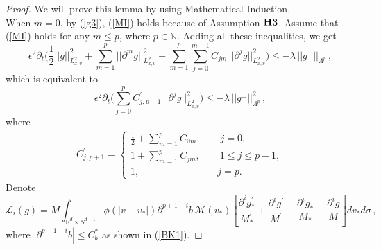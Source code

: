 \documentclass[final,onefignum,onetabnum]{siamart171218}
\begin{document}
 \begin{proof}
We will prove this lemma by using Mathematical Induction. \\
When $m=0$, by (\ref{g3}), (\ref{MI}) holds because of Assumption ${\bf H3}$. 
Assume that (\ref{MI}) holds for any $m\leq p$, where $p\in \mathbb N$. Adding all these inequalities, we get
$$ \epsilon^2 \partial_t \bigg(\frac{1}{2}||g||_{L^2_{x,v}}^2 + \sum_{m=1}^{p} ||\partial^m g||_{L^2_{x,v}}^2 + 
\sum_{m=1}^{p} \sum_{j=0}^{m-1} C_{jm}\, ||\partial^j g||_{L^2_{x,v}}^2 \bigg)\leq -\lambda\,||g^{\perp}||_{\Lambda^{p}}\,,$$
which is equivalent to 
\begin{equation}\label{p0}\epsilon^2 
\partial_t \bigg(\sum_{j=0}^p C_{j,p+1}^{\prime}\, ||\partial^j g||_{L^2_{x,v}}^2 \bigg) \leq -\lambda\, ||g^{\perp}||_{\Lambda^{p}}^2\,,
\end{equation}
where 
\begin{align*}
\displaystyle C_{j,p+1}^{\prime} =
 \begin{cases} \frac{1}{2} + \sum_{m=1}^{p} C_{0m}, \qquad j=0, \\[2pt]
                        1 + \sum_{m=1}^{p} C_{jm}, \qquad 1\leq j\leq p-1, \\[2pt]       
                        1, \qquad\qquad\qquad\qquad j=p.           
 \end{cases}
\end{align*}
Denote
\begin{equation}\label{Li}\mathcal L_{i}(g) = M \int_{\mathbb R^d\times S^{d-1}} \phi(|v-v_{\ast}|)\partial^{p+1-i}b\, \mathcal M(v_{\ast}) 
\left[\frac{\partial^i g_{\ast}^{\prime}}{M_{\ast}^{\prime}}+\frac{\partial^i g^{\prime}}{M^{\prime}}-\frac{\partial^i g_{\ast}}{M_{\ast}}-\frac{\partial^i g}{M}\right] dv_{\ast}d\sigma\,,\end{equation}
where $|\partial^{p+1-i}b|\leq C_b^{\ast}$ as shown in (\ref{BK1}).


\end{proof}
\end{document}
